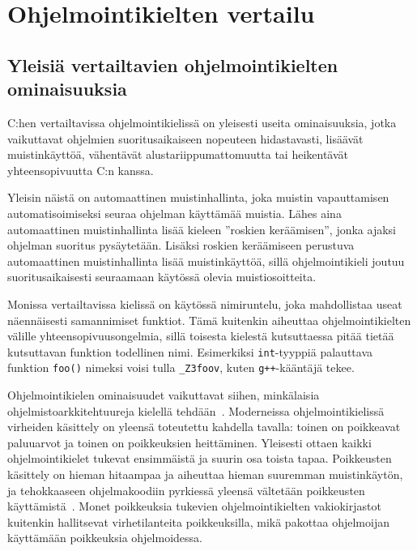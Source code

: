 \section{Ohjelmointikielten vertailu}
\label{sec:muut}

\subsection{Yleisiä vertailtavien ohjelmointikielten ominaisuuksia}

C:hen vertailtavissa ohjelmointikielissä on yleisesti useita ominaisuuksia,
jotka vaikuttavat ohjelmien suoritusaikaiseen nopeuteen hidastavasti, lisäävät
muistinkäyttöä, vähentävät alustariippumattomuutta tai heikentävät
yhteensopivuutta C:n kanssa.

Yleisin näistä on automaattinen muistinhallinta, joka muistin vapauttamisen
automatisoimiseksi seuraa ohjelman käyttämää muistia. Lähes aina automaattinen
muistinhallinta lisää kieleen ''roskien keräämisen'', jonka ajaksi ohjelman suoritus pysäytetään. Lisäksi roskien
keräämiseen perustuva automaattinen muistinhallinta lisää muistinkäyttöä, sillä
ohjelmointikieli joutuu suoritusaikaisesti seuraamaan käytössä olevia
muistiosoitteita.

Monissa vertailtavissa kielissä on käytössä nimiruntelu,
joka mahdollistaa useat näennäisesti samannimiset funktiot. Tämä kuitenkin
aiheuttaa ohjelmointikielten välille yhteensopivuusongelmia, sillä toisesta
kielestä kutsuttaessa pitää tietää kutsuttavan funktion todellinen nimi.
Esimerkiksi \texttt{int}-tyyppiä palauttava funktion \texttt{foo()} nimeksi
voisi tulla \texttt{\_Z3foov}, kuten \texttt{g++}-kääntäjä tekee.

Ohjelmointikielen ominaisuudet vaikuttavat siihen, minkälaisia
ohjelmistoarkkitehtuureja kielellä tehdään~\citep{designpatternsdesign}.
Moderneissa ohjelmointikielissä virheiden käsittely on yleensä toteutettu
kahdella tavalla: toinen on poikkeavat paluuarvot ja toinen on poikkeuksien
heittäminen. Yleisesti ottaen kaikki ohjelmointikielet tukevat ensimmäistä ja
suurin osa toista tapaa. Poikkeusten käsittely on hieman hitaampaa ja aiheuttaa
hieman suuremman muistinkäytön, ja tehokkaaseen ohjelmakoodiin pyrkiessä
yleensä vältetään poikkeusten käyttämistä~\citep{exceptioncosts}. Monet
poikkeuksia tukevien ohjelmointikielten vakiokirjastot kuitenkin hallitsevat
virhetilanteita poikkeuksilla, mikä pakottaa ohjelmoijan käyttämään poikkeuksia
ohjelmoidessa.

